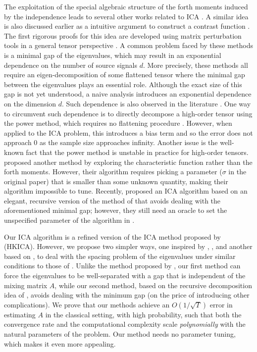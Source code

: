 \documentclass[11pt]{article}
\begin{document}
The exploitation of the special algebraic structure of the forth moments induced by the independence leads to several other works related to ICA \citep{hsu2013learning,anandkumar2012tensordecomposition,anandkumar2012method}. 
A similar idea is also discussed earlier as a intuitive argument to construct a contrast function \citep{cardoso1999high}. 
The first rigorous proofs for this idea are developed using matrix perturbation tools in a general tensor perspective \citep{anandkumar2012tensordecomposition,anandkumar2012method,goyal2014fourier}. 
A common problem faced by these methods is a minimal gap of the eigenvalues, which may result in an exponential dependence on the number of source signals $d$.
More precisely, these methods all require an eigen-decomposition of some flattened tensor where the minimal gap between the eigenvalues plays an essential role. 
Although the exact size of this gap is not yet understood, a naive analysis introduces an exponential dependence on the dimension $d$. 
Such dependence is also observed in the literature \citep{cardoso1999high,goyal2014fourier}.
One way to circumvent such dependence is to directly decompose a high-order tensor using the power method, which requires no flattening procedure \citep{anandkumar2014guaranteed}. 
However, when applied to the ICA problem, this introduces a bias term and so the error does not approach 0 as the sample size approaches infinity.
Another issue is the well-known fact that the power method is unstable in practice for high-order tensors. 
\citet{goyal2014fourier} proposed another method by exploring the characteristic function rather than the forth moments.
However, their algorithm requires picking a parameter ($\sigma$ in the original paper) that is smaller than some unknown quantity, making their algorithm impossible to tune.
Recently, \citet{vempala2014max} proposed an ICA algorithm based on an elegant, recursive version of the method of \citet{goyal2014fourier} that avoids dealing with the aforementioned minimal gap; however, they still need an oracle to set the unspecified parameter of the algorithm in  \citep{goyal2014fourier}.

Our ICA algorithm is a refined version of the ICA method proposed by \cite{hsu2013learning} (HKICA). 
However, we propose two simpler ways, one inspired by \citet{frieze1996learning}, \citet{arora2012provable}, and another based on \citet{vempala2014max}, to deal with the spacing problem of the eigenvalues under similar conditions to those of \citet{goyal2014fourier}.
Unlike the method proposed by \citet{goyal2014fourier}, our first method can force the eigenvalues to be well-separated with a gap that is independent of the mixing matrix $A$, while our second method, based on the recursive decomposition idea of \citet{vempala2014max}, avoids dealing with the minimum gap (on the price of introducing other complications).
We prove that our methods achieve an $O(1/\sqrt{T})$ error in estimating $A$ in the classical setting, with high probability, such that both the convergence rate and the computational complexity scale \emph{polynomially} with the natural parameters of the problem. 
Our method needs no parameter tuning, which makes it even more appealing. 
\end{document}
